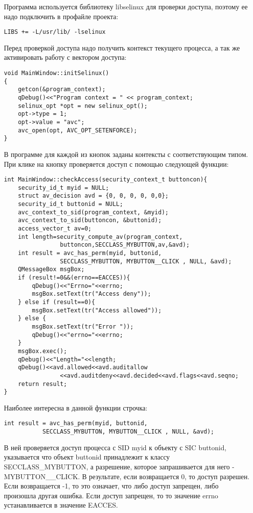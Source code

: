 \documentclass{./../class/UIR}
\begin{document}
    Программа используется библиотеку libselinux для проверки доступа, поэтому
    ее надо подключить в профайле проекта:
\begin{verbatim}
LIBS += -L/usr/lib/ -lselinux
\end{verbatim}

     Перед проверкой доступа надо получить контекст текущего процесса, а так же
     активировать работу с вектором доступа:
\begin{verbatim}
void MainWindow::initSelinux()
{
    getcon(&program_context);
    qDebug()<<"Program context = " << program_context;
    selinux_opt *opt = new selinux_opt();
    opt->type = 1;
    opt->value = "avc";
    avc_open(opt, AVC_OPT_SETENFORCE);
}
\end{verbatim}
    В программе для каждой из кнопок заданы контексты с соответствующим типом.
    При клике на кнопку проверяется доступ с помощью следующей функции:
\begin{verbatim}
int MainWindow::checkAccess(security_context_t buttoncon){
    security_id_t myid = NULL;
    struct av_decision avd = {0, 0, 0, 0, 0,0};
    security_id_t buttonid = NULL;
    avc_context_to_sid(program_context, &myid);
    avc_context_to_sid(buttoncon, &buttonid);
    access_vector_t av=0;
    int length=security_compute_av(program_context,
                buttoncon,SECCLASS_MYBUTTON,av,&avd);
    int result = avc_has_perm(myid, buttonid, 
                SECCLASS_MYBUTTON, MYBUTTON__CLICK , NULL, &avd);
    QMessageBox msgBox;
    if (result!=0&&(errno==EACCES)){
        qDebug()<<"Errno="<<errno;
        msgBox.setText(tr("Access deny"));
    } else if (result==0){
        msgBox.setText(tr("Access allowed"));
    } else {
        msgBox.setText(tr("Error "));
        qDebug()<<"errno="<<errno;
    }
    msgBox.exec();
    qDebug()<<"Length="<<length;
    qDebug()<<avd.allowed<<avd.auditallow
                <<avd.auditdeny<<avd.decided<<avd.flags<<avd.seqno;
    return result;
}
    \end{verbatim}
	Наиболее интересна в данной функции строчка:
	\begin{verbatim}
int result = avc_has_perm(myid, buttonid,
           SECCLASS_MYBUTTON, MYBUTTON__CLICK ,	NULL, &avd);
	\end{verbatim}
	В ней проверяется доступ процесса с SID myid к объекту с SIC buttonid,
	указывается что объект buttonid принадлежит к классу SECCLASS\_MYBUTTON, а
	разрешение, которое запрашивается для него - MYBUTTON\_\_CLICK.
	В результате, если возвращается 0, то доступ разрешен. Если возвращается -1, то
	это означает, что либо доступ запрещен, либо произошла другая ошибка. Если
	доступ запрещен, то то значение errno устанавливается в значение EACCES.
	
\end{document}
